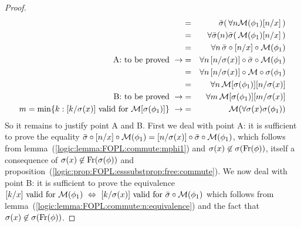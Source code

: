 \begin{proof}
\begin{eqnarray*}
    &=&\bar{\sigma}(\,\forall n{\cal M}(\phi_{1})[n/x]\,)\\
    &=&\forall \bar{\sigma}(n)\bar{\sigma}(\,{\cal
    M}(\phi_{1})[n/x]\,)\\
    &=&\forall n\,\bar{\sigma}\circ [n/x]\circ{\cal
    M}(\phi_{1})\\
    \mbox{A: to be proved}\ \rightarrow
    &=&\forall n\,[n/\sigma(x)]\circ\bar{\sigma}\circ{\cal M}(\phi_{1})\\
    &=&\forall n\,[n/\sigma(x)]\circ{\cal M}\circ\sigma(\phi_{1})\\
    &=&\forall n\,{\cal M}[\sigma(\phi_{1})][n/\sigma(x)]\\
    \mbox{B: to be proved}\ \rightarrow
    &=&\forall m\,{\cal M}[\sigma(\phi_{1})][m/\sigma(x)]\\
    \mbox{$m=\min\{k:[k/\sigma(x)]\mbox{ valid for }{\cal M}[\sigma(\phi_{1})]\}$}\
    \rightarrow
    &=&{\cal M}(\forall\sigma(x)\sigma(\phi_{1}))\\
    \end{eqnarray*}
So it remains to justify point A and B. First we deal with point A:
it is sufficient to prove the equality
$\bar{\sigma}\circ[n/x]\circ{\cal M}(\phi_{1})=
[n/\sigma(x)]\circ\bar{\sigma}\circ{\cal M}(\phi_{1})$, which
follows from lemma~(\ref{logic:lemma:FOPL:commute:mphi1}) and
$\sigma(x)\not\in\sigma(\mbox{\rm Fr}(\phi))$, itself a consequence of
$\sigma(x)\not\in\mbox{\rm Fr}(\sigma(\phi))$ and
proposition~(\ref{logic:prop:FOPL:esssubstprop:free:commute}). We
now deal with point B: it is sufficient to prove the equivalence
$\mbox{$[k/x]$ valid for ${\cal M}(\phi_{1})$}\ \Leftrightarrow\
\mbox{$[k/\sigma(x)]$ valid for $\bar{\sigma}\circ{\cal
M}(\phi_{1})$}$ which follows from
lemma~(\ref{logic:lemma:FOPL:commute:n:equivalence}) and the fact
that $\sigma(x)\not\in\sigma(\mbox{\rm Fr}(\phi))$.
\end{proof}


